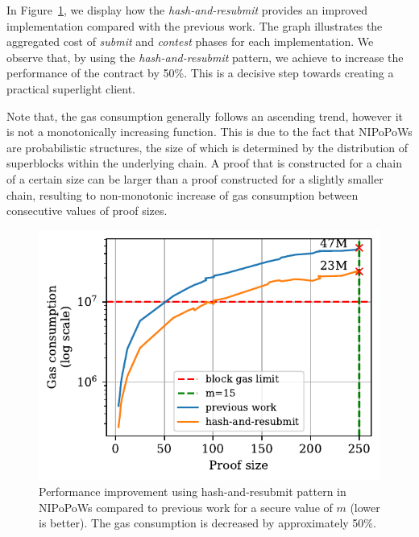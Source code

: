 In Figure~\ref{fig:har-nipopow}, we display how the \emph{hash-and-resubmit}
provides an improved implementation compared with the previous work. The graph
illustrates the aggregated cost of \emph{submit} and \emph{contest} phases for
each implementation. We observe that, by using the \emph{hash-and-resubmit}
pattern, we achieve to increase the performance of the contract by 50\%. This
is a decisive step towards creating a practical superlight client.

Note that, the gas consumption generally follows an ascending trend, however it
is not a monotonically increasing function. This is due to the fact that
NIPoPoWs are probabilistic structures, the size of which is determined by the
distribution of superblocks within the underlying chain. A proof that is
constructed for a chain of a certain size can be larger than a proof
constructed for a slightly smaller chain, resulting to non-monotonic increase
of gas consumption between consecutive values of proof sizes.



\begin{figure}[!h]
    \begin{center}
        \includegraphics[width=1\columnwidth]{figures/har-nipopows.pdf}
    \end{center}
    \caption{Performance improvement using hash-and-resubmit pattern in
        NIPoPoWs compared to previous work for a secure value of $m$ (lower is
        better). The gas consumption is decreased by approximately 50\%.}
    \label{fig:har-nipopow}
\end{figure}
